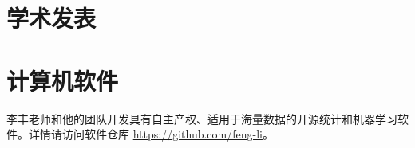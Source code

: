 \documentclass[twoside,a4paper,11pt]{article}
\begin{document}
\section{学术发表}
\begin{refsection}
\nocite{ZhongY2025OptimalStarting}
\nocite{WangWen2025VARX}
\nocite{GaoY2024GridPoint}
\nocite{WangH2024CatastropheDuration}
\nocite{HuangY2024LocalInformation}
\nocite{RenY2023InfiniteForecast}
\nocite{ZhangG2023ProbabilisticForecast}
\nocite{LiF2024ForecasterReview}
\nocite{LiL2023ForecastingLarge}
\nocite{ZhangB2023OptimalReconciliation}
\nocite{LiL2023FeaturebasedIntermittent}
\nocite{WangX2023ForecastCombinations}
\nocite{PanR2022NoteDistributed}
\nocite{LiL2023BayesianForecast}
\nocite{WangZ2022EscalatorAccident}
\nocite{WangX2023DistributedARIMA}
\nocite{AndererM2022HierarchicalForecasting}
\nocite{JanewayMG2021ClinicalDiagnostic}
\nocite{PetropoulosF2022ForecastingTheory}
\nocite{KangY2022ForecastForecasts}
\nocite{TalagalaTS2022FFORMPPFeaturebased}
\nocite{ZhuX2021LeastSquareApproximation}
\nocite{WangX2022UncertaintyEstimation}
\nocite{KangY2021DejaVu}
\nocite{HaoC2020BilinearReduced}
\nocite{LiX2020ForecastingTime}
\nocite{KangY2020GRATISGeneRAting}
\nocite{kang2020statcompcn}
\nocite{kang2020fppcn}
\nocite{KalesanB2020IntersectionsFirearm}
\nocite{BaileyHM2019ChangesPatterns}
\nocite{LiF2019CreditRisk}
\nocite{LiF2018ImprovingForecasting}
\nocite{PinoEC2018CohortProfile}
\nocite{li2016distributedcn}
\nocite{LiF2013BayesianModeling}
\nocite{LiF2013EfficientBayesian}
\nocite{LiF2011ModellingConditional}
\nocite{LiF2010FlexibleModeling}

\printbibliography[heading=none]
\end{refsection}

\newpage
\section{计算机软件}
李丰老师和他的团队开发具有自主产权、适用于海量数据的开源统计和机器学习软件。详情请访问软件仓库 \url{https://github.com/feng-li}。
\end{document}
